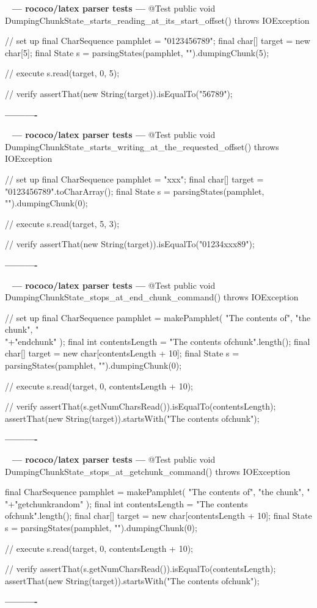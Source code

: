\documentclass{book}
\newenvironment{chunk}[1]{%
{\ }\newline\noindent%
\hbox{\hskip 2.0cm}{\bf --- #1 ---}%
\verbatim}%                               say exactly what we see
{\endverbatim%
\par{}%
\noindent{}%
\hbox{\hskip 2.0cm}{\bf ----------}%
\par%
\normalsize\noindent}%
\begin{document}
\begin{chunk}{rococo/latex parser tests}
@Test
public void DumpingChunkState_starts_reading_at_its_start_offset() throws IOException {
    // set up
    final CharSequence pamphlet = "0123456789";
    final char[] target = new char[5];
    final State s = parsingStates(pamphlet, "").dumpingChunk(5);

    // execute
    s.read(target, 0, 5);

    // verify
    assertThat(new String(target)).isEqualTo("56789");
}
\end{chunk}

\begin{chunk}{rococo/latex parser tests}
@Test
public void DumpingChunkState_starts_writing_at_the_requested_offset() throws IOException {
    // set up
    final CharSequence pamphlet = "xxx";
    final char[] target = "0123456789".toCharArray();
    final State s = parsingStates(pamphlet, "").dumpingChunk(0);

    // execute
    s.read(target, 5, 3);

    // verify
    assertThat(new String(target)).isEqualTo("01234xxx89");
}
\end{chunk}

\begin{chunk}{rococo/latex parser tests}
@Test
public void DumpingChunkState_stops_at_end_chunk_command() throws IOException {
    // set up
    final CharSequence pamphlet = makePamphlet(
            "The contents of",
            "the chunk",
            "\\"+"end{chunk}"
    );
    final int contentsLength = "The contents of\nthe chunk\n".length();
    final char[] target = new char[contentsLength + 10];
    final State s = parsingStates(pamphlet, "").dumpingChunk(0);

    // execute
    s.read(target, 0, contentsLength + 10);

    // verify
    assertThat(s.getNumCharsRead()).isEqualTo(contentsLength);
    assertThat(new String(target)).startsWith("The contents of\nthe chunk\n");
}
\end{chunk}

\begin{chunk}{rococo/latex parser tests}
@Test
public void DumpingChunkState_stops_at_getchunk_command() throws IOException {
    final CharSequence pamphlet = makePamphlet(
            "The contents of",
            "the chunk",
            "\\"+"getchunk{random}"
    );
    final int contentsLength = "The contents of\nthe chunk\n".length();
    final char[] target = new char[contentsLength + 10];
    final State s = parsingStates(pamphlet, "").dumpingChunk(0);

    // execute
    s.read(target, 0, contentsLength + 10);

    // verify
    assertThat(s.getNumCharsRead()).isEqualTo(contentsLength);
    assertThat(new String(target)).startsWith("The contents of\nthe chunk\n");
}
\end{chunk}
\end{document}
